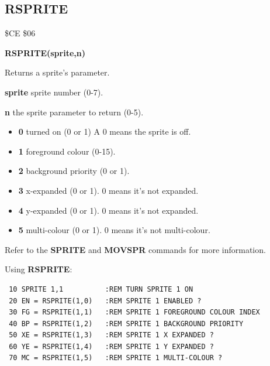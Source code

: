 \subsection{RSPRITE}
\begin{description}[leftmargin=2cm,style=nextline]
\item [Token:] \$CE \$06
\item [Format:] {\bf RSPRITE(sprite,n)}
\item [Usage:]  Returns a sprite's parameter.

                {\bf sprite} sprite number (0-7).

                {\bf n} the sprite parameter to return (0-5).

                \begin{itemize}
                    \item {\bf 0} turned on (0 or 1) A 0 means the sprite is off.
                    \item {\bf 1} foreground colour (0-15).
                    \item {\bf 2} background priority (0 or 1).
                    \item {\bf 3} x-expanded (0 or 1). 0 means it's not expanded.
                    \item {\bf 4} y-expanded (0 or 1). 0 means it's not expanded.
                    \item {\bf 5} multi-colour (0 or 1).  0 means it's not multi-colour.
                \end{itemize}

\item [Remarks:] Refer to the {\bf SPRITE} and {\bf MOVSPR} commands for more information.

\item [Example:] Using {\bf RSPRITE}:
\begin{tcolorbox}[colback=black,coltext=white]
\verbatimfont{\codefont}
\begin{verbatim}
 10 SPRITE 1,1          :REM TURN SPRITE 1 ON
 20 EN = RSPRITE(1,0)   :REM SPRITE 1 ENABLED ?
 30 FG = RSPRITE(1,1)   :REM SPRITE 1 FOREGROUND COLOUR INDEX
 40 BP = RSPRITE(1,2)   :REM SPRITE 1 BACKGROUND PRIORITY
 50 XE = RSPRITE(1,3)   :REM SPRITE 1 X EXPANDED ?
 60 YE = RSPRITE(1,4)   :REM SPRITE 1 Y EXPANDED ?
 70 MC = RSPRITE(1,5)   :REM SPRITE 1 MULTI-COLOUR ?
\end{verbatim}
\end{tcolorbox}
\end{description}



